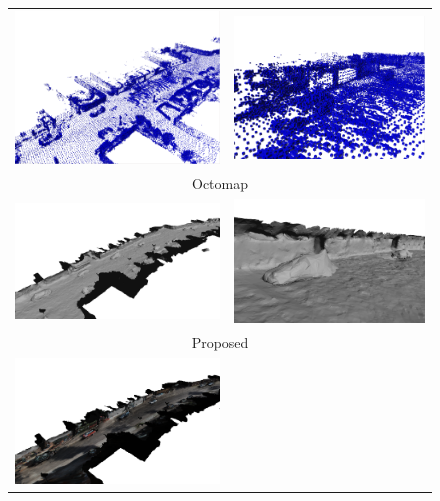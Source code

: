 \begin{figure}[tbp]
 \centering
\setlength{\tabcolsep}{1px}
    \begin{tabular}{cc}
    \includegraphics[width=0.45\columnwidth]{./img/ch-laser/octo06}&
    \includegraphics[width=0.45\columnwidth]{./img/ch-laser/octo05}\\
    \multicolumn{2}{c}{Octomap}\\
    \includegraphics[width=0.45\columnwidth]{./img/ch-laser/proposed0600}&
    \includegraphics[width=0.45\columnwidth]{./img/ch-laser/proposed0501}\\
    \multicolumn{2}{c}{Proposed}\\
    \includegraphics[width=0.45\columnwidth]{./img/ch-laser/proposed0601}&

\end{tabular}
\end{figure}
